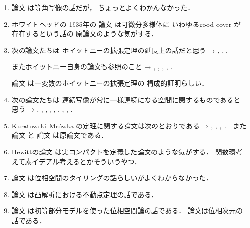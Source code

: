 \documentclass[leqno, a4paper, 12pt]{jsarticle}
\begin{document}
\begin{enumerate}[label=(\arabic*)]
単調正規空間の論文は他にもある
→
\cite{MR3414874}, 
\cite{MR1193194}, 
\cite{MR1425937},
\cite{MR2356193}．
また論文
\cite{MR2575894}
はGO 空間が単調正規であることの
直接証明らしい．



\item 
論文
\cite{conopeconfo}
は等角写像の話だが，
ちょっとよくわかんなかった．


\item 
ホワイトヘッドの
1935年の
論文
\cite{MR1503245}
は可微分多様体に
いわゆるgood cover
が存在するという話の
原論文のような気がする．


\item 
次の論文たちは
ホイットニーの拡張定理の延長上の話だと思う
→
\cite{MR2233851}, 
\cite{MR2339466}, 
\cite{MR2134225}, 
\cite{10.1093/qmath/os-7.1.1}

またホイットニー自身の論文も参照のこと
→
\cite{MR0009785},
\cite{MR1501875},
\cite{MR1562803},
\cite{MR1503173},
\cite{MR1501749}. 

論文
\cite{MR1191578}
は一変数のホイットニーの拡張定理の
構成的証明らしい．


\item 

次の論文たちは
連続写像が常に一様連続になる空間に関するものであると思う
→
\cite{MR0184200}, 
\cite{MR0619571}, 
\cite{MR0801222}, 
\cite{MR0837486}, 
\cite{MR0810180},
\cite{MR0099023}, 
\cite{MR0966244}, 
\cite{MR0106448}, 
\cite{MR0672468}. 



\item 
Kuratowski--Mr\'{o}wka
の定理に関する論文は次のとおりである
→
\cite{MR0250275}, 
\cite{MR0203701},
\cite{MR2584761}, 
\cite{MR0328865}．
また
論文
\cite{MR0117704}
と
論文
\cite{Kuratowski1931}
は原論文である．

\item 

Hewittの論文
\cite{MR0026239}
は実コンパクトを定義した論文のような気がする．
関数環考えて素イデアル考えるとかそういうやつ．


\item 
論文
\cite{MR1717184}
は位相空間のタイリングの話らしいがよくわからなかった．



\item
論文
\cite{wa2}
は凸解析における不動点定理の話である．




\item 
論文
\cite{wa4}
は初等部分モデルを使った位相空間論の話である．
論文\cite{wa3}は位相次元の話である．



\end{enumerate}
\end{document}
